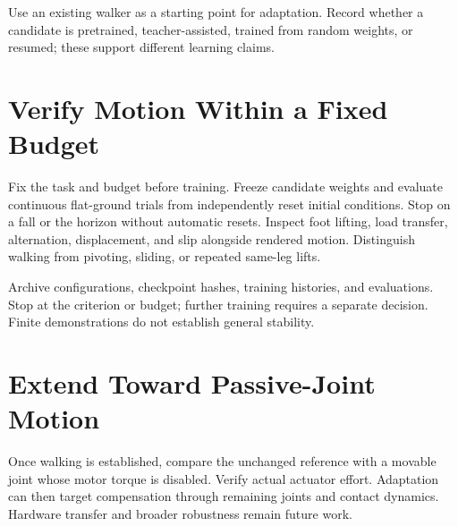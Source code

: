 Use an existing walker as a starting point for adaptation. Record whether a
candidate is pretrained, teacher-assisted, trained from random weights, or
resumed; these support different learning claims.

\section{Verify Motion Within a Fixed Budget}
Fix the task and budget before training. Freeze candidate weights and evaluate
continuous flat-ground trials from independently reset initial conditions.
Stop on a fall or the horizon without automatic resets. Inspect foot lifting,
load transfer, alternation, displacement, and slip alongside rendered motion.
Distinguish walking from pivoting, sliding, or repeated same-leg lifts.

Archive configurations, checkpoint hashes, training histories, and evaluations.
Stop at the criterion or budget; further training requires a separate decision.
Finite demonstrations do not establish general stability.

\section{Extend Toward Passive-Joint Motion}
Once walking is established, compare the unchanged reference with a movable
joint whose motor torque is disabled. Verify actual actuator effort. Adaptation
can then target compensation through remaining joints and contact dynamics.
Hardware transfer and broader robustness remain future work.

\begingroup
\raggedright


\endgroup

